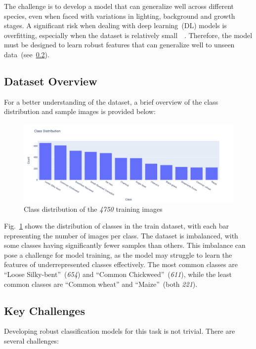 The challenge is to develop a model that can generalize well across different species, even when faced with variations in lighting, background and growth stages. A significant risk when dealing with deep learning~(DL) models is overfitting, especially when the dataset is relatively small~\cite[Chapter~1]{bishop2024deep}~\cite[Chapter~5]{Goodfellow-et-al-2016}. Therefore, the model must be designed to learn robust features that can generalize well to unseen data~(see~\ref{subsec:challenges}).

\subsection{Dataset Overview}
For a better understanding of the dataset, a brief overview of the class distribution and sample images is provided below:

\begin{figure}[htbp]
    \centerline{\includegraphics[width=0.9\linewidth]{../../resources/class_distribution.png}}
    \caption{Class distribution of the \textit{4750} training images}
    \label{fig:class-distribution}
\end{figure}

Fig.~\ref{fig:class-distribution} shows the distribution of classes in the train dataset, with each bar representing the number of images per class. The dataset is imbalanced, with some classes having significantly fewer samples than others. This imbalance can pose a challenge for model training, as the model may struggle to learn the features of underrepresented classes effectively. The most common classes are ``Loose Silky-bent''~(\textit{654}) and ``Common Chickweed''~(\textit{611}), while the least common classes are ``Common wheat'' and ``Maize''~(both \textit{221}).

\subsection{Key Challenges}\label{subsec:challenges}
Developing robust classification models for this task is not trivial. There are several challenges:

